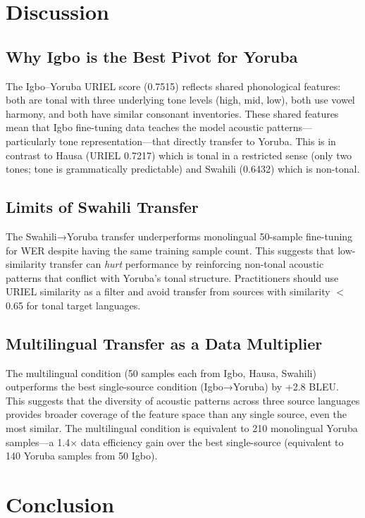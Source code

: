 \documentclass[11pt,a4paper]{article}
\begin{document}
\section{Discussion}
\label{sec:discussion}

\subsection{Why Igbo is the Best Pivot for Yoruba}
The Igbo–Yoruba URIEL score (0.7515) reflects shared phonological features: both are tonal with three underlying tone levels (high, mid, low), both use vowel harmony, and both have similar consonant inventories. These shared features mean that Igbo fine-tuning data teaches the model acoustic patterns—particularly tone representation—that directly transfer to Yoruba. This is in contrast to Hausa (URIEL 0.7217) which is tonal in a restricted sense (only two tones; tone is grammatically predictable) and Swahili (0.6432) which is non-tonal.

\subsection{Limits of Swahili Transfer}
The Swahili→Yoruba transfer underperforms monolingual 50-sample fine-tuning for WER despite having the same training sample count. This suggests that low-similarity transfer can \emph{hurt} performance by reinforcing non-tonal acoustic patterns that conflict with Yoruba's tonal structure. Practitioners should use URIEL similarity as a filter and avoid transfer from sources with similarity $<$ 0.65 for tonal target languages.

\subsection{Multilingual Transfer as a Data Multiplier}
The multilingual condition (50 samples each from Igbo, Hausa, Swahili) outperforms the best single-source condition (Igbo→Yoruba) by +2.8 BLEU. This suggests that the diversity of acoustic patterns across three source languages provides broader coverage of the feature space than any single source, even the most similar. The multilingual condition is equivalent to 210 monolingual Yoruba samples—a 1.4$\times$ data efficiency gain over the best single-source (equivalent to 140 Yoruba samples from 50 Igbo).

\section{Conclusion}
\label{sec:conclusion}
\end{document}
